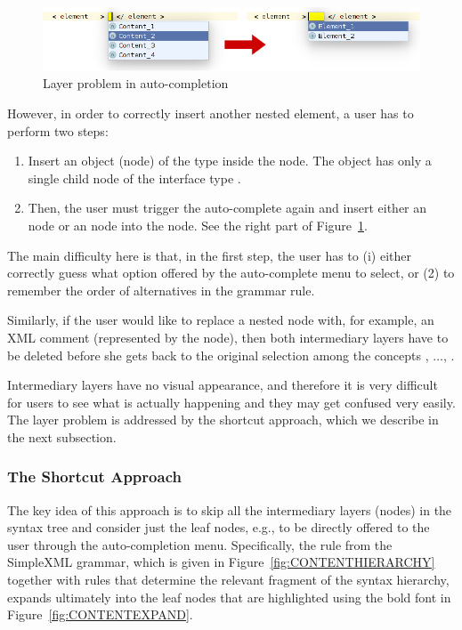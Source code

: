 \begin{figure}[ht]
	\centering
	\includegraphics[scale=0.5]{./images/layer_problem.png}
	\caption{Layer problem in auto-completion}
	\label{fig:LAYERPROBLEM}
\end{figure}

However, in order to correctly insert another nested element, a user has to perform two steps:
\begin{enumerate}
	\item Insert an object (node) of the type  inside the  node. The  object has only a single child node of the interface type .
	\item Then, the user must trigger the auto-complete again and insert either an  node or an  node into the  node. See the right part of Figure~\ref{fig:LAYERPROBLEM}.
\end{enumerate}
The main difficulty here is that, in the first step, the user has to (i) either correctly guess what option offered by the auto-complete menu to select, or (2) to remember the order of alternatives in the grammar rule.

Similarly, if the user would like to replace a nested  node with, for example, an XML comment (represented by the  node), then both intermediary layers have to be deleted before she gets back to the original selection among the concepts , $\ldots$, .

Intermediary layers have no visual appearance, and therefore it is very difficult for users to see what is actually happening and they may get confused very easily.
The layer problem is addressed by the shortcut approach, which we describe in the next subsection.

\subsubsection{The Shortcut Approach}
\label{sect:SHORTCUT}

The key idea of this approach is to skip all the intermediary layers (nodes) in the syntax tree and consider just the leaf nodes, e.g., to be directly offered to the user through the auto-completion menu.
Specifically, the  rule from the SimpleXML grammar, which is given in Figure~\ref{fig:CONTENTHIERARCHY} together with rules that determine the relevant fragment of the syntax hierarchy, expands ultimately into the leaf nodes that are highlighted using the bold font in Figure~\ref{fig:CONTENTEXPAND}.

